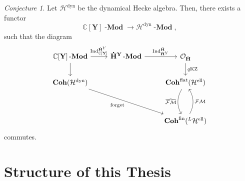 \documentclass[a4paper]{report}
\theoremstyle{theorem}
\theoremstyle{definition}
\theoremstyle{remark}
\theoremstyle{proposition}
\theoremstyle{conjecture}
\newtheorem{conjecture}{Conjecture}
\theoremstyle{lemma}
\theoremstyle{corollary}
\theoremstyle{exercise}
\theoremstyle{example}
\newcommand{\C}{\mathbb{C}}
\newcommand{\mcal}{\mathcal}
\newcommand{\on}{\operatorname}
\newcommand{\coh}{\on{\mathbf{Coh}}}
\newcommand{\lmod}{\on{\mathbf{-Mod}}}
\newcommand{\qKZ}{\on{\mathit{q}KZ}}
\begin{document}
  \begin{conjecture}\label{main_thm3}
      Let $\mcal{H}^{\on{dyn}}$ be the dynamical Hecke algebra.
      Then, there exists a functor 
      $$\C[\mathbf{Y}]\lmod \longrightarrow \mcal{H}^{\on{dyn}}\lmod,$$
      such that the diagram 
      $$\begin{tikzcd}
  \C[\mathbf{Y}]\lmod \arrow[r, "\on{Ind}_{\C[\mathbf{Y}]}^{\mathbf{\dot{H}}^Y}"] \arrow[d] & \mathbf{\dot{H}}^{\mathbf{Y}}\lmod \arrow[r, "\on{Ind}_{\mathbf{\dot{H}}^Y}^{\mathbf{\ddot{\mathbf{H}}}}"] & \mcal{O}_{\ddot{\mathbf{H}}} \arrow[d, "\qKZ"]                                         \\
  \coh(\mcal{H}^{\on{dyn}}) \arrow[rrdd, "\on{forget}"']                                    &                                                                                                   & \coh^{\on{flat}}(\mcal{H}^{\on{ell}}) \arrow[dd, "\widehat{\mcal{FM}}"', bend right] \\
                                                                                            &                                                                                                   &                                                                                           \\
                                                                                            &                                                                                                   & \coh^{\on{fin}}({}^L\mcal{H}^{\on{ell}}) \arrow[uu, "\mcal{FM}"', bend right]     
  \end{tikzcd}$$
      commutes. 
  \end{conjecture}
  \section*{Structure of this Thesis}
  
\end{document}
